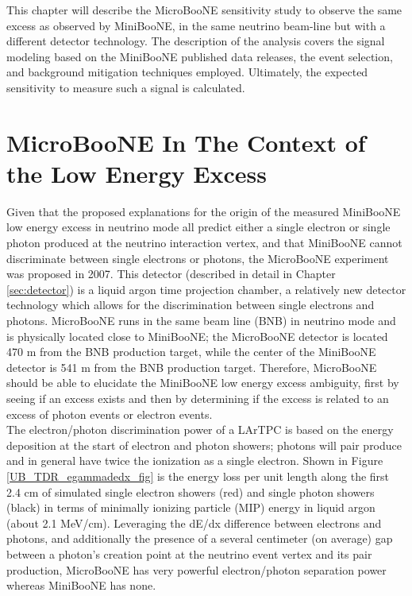 This chapter will describe the MicroBooNE sensitivity study to observe the same excess as observed by MiniBooNE, in the same neutrino beam-line but with a different detector technology. The description of the analysis covers the signal modeling based on the MiniBooNE published data releases, the event selection, and background mitigation techniques employed. Ultimately, the expected sensitivity to measure such a signal is calculated.

\section{MicroBooNE In The Context of the Low Energy Excess}

Given that the proposed explanations for the origin of the measured MiniBooNE low energy excess in neutrino mode all predict either a single electron or single photon produced at the neutrino interaction vertex, and that MiniBooNE cannot discriminate between single electrons or photons, the MicroBooNE experiment was proposed in 2007. This detector (described in detail in Chapter \ref{sec:detector}) is a liquid argon time projection chamber, a relatively new detector technology which allows for the discrimination between single electrons and photons. MicroBooNE runs in the same beam line (BNB) in neutrino mode and is physically located close to MiniBooNE; the MicroBooNE detector is located 470 m from the BNB production target, while the center of the MiniBooNE detector is 541 m from the BNB production target. Therefore, MicroBooNE should be able to elucidate the MiniBooNE low energy excess ambiguity, first by seeing if an excess exists and then by determining if the excess is related to an excess of photon events or electron events.\\

The electron/photon discrimination power of a LArTPC is based on the energy deposition at the start of electron and photon showers; photons will pair produce and in general have twice the ionization as a single electron. Shown in Figure \ref{UB_TDR_egammadedx_fig} is the energy loss per unit length along the first 2.4 cm of simulated single electron showers (red) and single photon showers (black) in terms of minimally ionizing particle (MIP) energy in liquid argon (about 2.1 MeV/cm). Leveraging the dE/dx difference between electrons and photons, and additionally the presence of a several centimeter (on average) gap between a photon's creation point at the neutrino event vertex and its pair production, MicroBooNE has very powerful electron/photon separation power whereas MiniBooNE has none.\\

